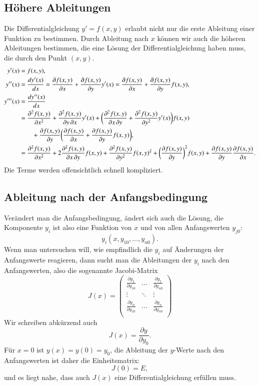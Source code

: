 \subsection{Höhere Ableitungen\label{grundlagen:hoehere-ableitungen}}
%
Die Differentialgleichung $y'=f(x,y)$ erlaubt nicht nur die erste
Ableitung einer Funktion zu bestimmen.
Durch Ableitung nach $x$ können wir auch die höheren Ableitungen
bestimmen, die eine Lösung der Differentialgleichung haben muss,
die durch den Punkt $(x,y)$.
\begin{align}
y'(x)
&=
f(x,y),
\notag
\\
y''(x)
&=
\frac{dy'(x)}{dx}
=
\frac{\partial f(x,y)}{\partial x} + \frac{\partial f(x,y)}{\partial y}y'(x)
=
\frac{\partial f(x,y)}{\partial x} + \frac{\partial f(x,y)}{\partial y}f(x,y),
\label{grundlagen:2abl}
\\
y'''(x)
&=
\frac{dy''(x)}{dx}
\notag
\\
&=
\frac{\partial^2 f(x,y)}{\partial x^2}
+ \frac{\partial^2 f(x,y)}{\partial y\,\partial x}y'(x)
+ \biggl(\frac{\partial^2 f(x,y)}{\partial x\,\partial y}
+ \frac{\partial^2 f(x,y)}{\partial y^2}y'(x)\biggr)f(x,y)
\notag
\\
&\qquad
+ \frac{\partial f(x,y)}{\partial y}\biggl(
\frac{\partial f(x,y)}{\partial x} + \frac{\partial f(x,y)}{\partial y}f(x,y)
\biggr),
\notag
\\
&=
\frac{\partial^2 f(x,y)}{\partial x^2}
+ 2\frac{\partial^2 f(x,y)}{\partial x\,\partial y}f(x,y)
+ \frac{\partial^2 f(x,y)}{\partial y^2}f(x,y)^2
+ \biggl(\frac{\partial f(x,y)}{\partial y}\biggr)^2 f(x,y)
+ \frac{\partial f(x,y)}{\partial y} \frac{\partial f(x,y)}{\partial x}.
\label{grundlagen:3abl}
\end{align}
Die Terme werden offensichtlich schnell kompliziert.

\subsection{Ableitung nach der Anfangsbedingung\label{grundlagen:jacobi}}
%
Verändert man die Anfangsbedingung, ändert sich auch die Lösung,
die Komponente $y_i$ ist also eine Funktion von $x$ und
von allen Anfangswerten $y_{j0}$:
\[
y_i(x, y_{10},\dots,y_{n0}).
\]
Wenn man untersuchen will, wie empfindlich die $y_i$ auf Änderungen
der Anfangswerte reagieren, dann sucht man die Ableitungen der $y_i$
nach den Anfangswerten, also die sogenannte Jacobi-Matrix
%
\[
J(x)
=
\begin{pmatrix}
\displaystyle\frac{\partial y_1}{\partial y_{10}}&\dots&
	\displaystyle\frac{\partial y_1}{\partial y_{n0}}\\
\vdots&\ddots&\vdots\\
\displaystyle\frac{\partial y_n}{\partial y_{10}}&\dots&
	\displaystyle\frac{\partial y_n}{\partial y_{n0}}\\
\end{pmatrix}
\]
Wir schreiben abkürzend auch 
\[
J(x)= \frac{\partial y}{\partial y_0}.
\]
Für $x=0$ ist $y(x)=y(0)=y_0$, die Ableitung der $y$-Werte nach den
Anfangswerten ist daher die Einheitsmatrix:
\[
J(0)=E,
\]
und es liegt nahe, dass auch $J(x)$ eine Differentialgleichung erfüllen
muss.

